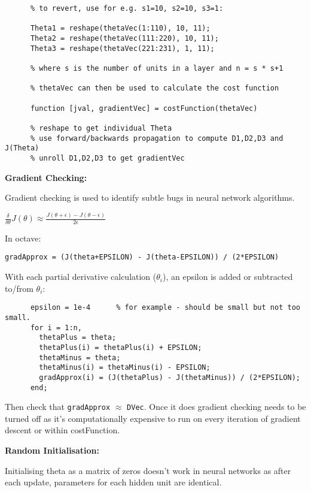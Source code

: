 \documentclass[12pt] {article}
\begin{document}
{\begin{lstlisting}
      % to revert, use for e.g. s1=10, s2=10, s3=1:

      Theta1 = reshape(thetaVec(1:110), 10, 11);
      Theta2 = reshape(thetaVec(111:220), 10, 11);
      Theta3 = reshape(thetaVec(221:231), 1, 11);

      % where s is the number of units in a layer and n = s * s+1

      % thetaVec can then be used to calculate the cost function

      function [jval, gradientVec] = costFunction(thetaVec)

      % reshape to get individual Theta
      % use forward/backwards propagation to compute D1,D2,D3 and J(Theta)
      % unroll D1,D2,D3 to get gradientVec
      \end{lstlisting}

      \textbf{Gradient Checking:}

      Gradient checking is used to identify subtle bugs in neural network
      algorithms.

      $\frac{\delta}{\delta\theta} J(\theta) \approx \frac{J(\theta+\epsilon)
      - J(\theta-\epsilon)}{2\epsilon}$

      In octave: 
      
      \texttt{gradApprox = (J(theta+EPSILON) - J(theta-EPSILON)) / (2*EPSILON)}

      With each partial derivative calculation ($\theta_i$), an epsilon is
      added or subtracted to/from $\theta_i$:

      \begin{lstlisting}
      epsilon = 1e-4      % for example - should be small but not too small.
      for i = 1:n,
        thetaPlus = theta;
        thetaPlus(i) = thetaPlus(i) + EPSILON;
        thetaMinus = theta;
        thetaMinus(i) = thetaMinus(i) - EPSILON;
        gradApprox(i) = (J(thetaPlus) - J(thetaMinus)) / (2*EPSILON);
      end;
      \end{lstlisting}

      Then check that \texttt{gradApprox} $\approx$ \texttt{DVec}. Once it does
      gradient checking needs to be turned off as it's computationally
      expensive to run on every iteration of gradient descent or within 
      costFunction.

      \textbf{Random Initialisation:}

      Initialising theta as a matrix of zeros doesn't work in neural networks
      as after each update, parameters for each hidden unit are identical.

}
\end{document}
